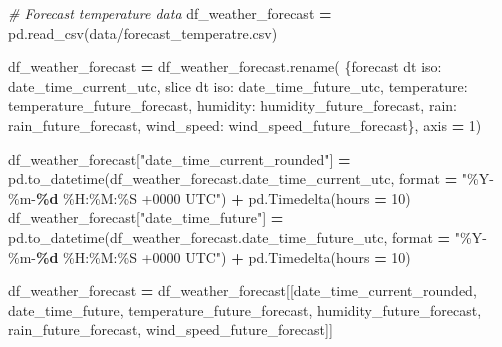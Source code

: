 \documentclass[mstat,12pt]{unswthesis}
\newenvironment{Shaded}{\begin{snugshade}}{\end{snugshade}}
\newcommand{\BuiltInTok}[1]{#1}
\newcommand{\CommentTok}[1]{\textcolor[rgb]{0.56,0.35,0.01}{\textit{#1}}}
\newcommand{\DecValTok}[1]{\textcolor[rgb]{0.00,0.00,0.81}{#1}}
\newcommand{\NormalTok}[1]{#1}
\newcommand{\OperatorTok}[1]{\textcolor[rgb]{0.81,0.36,0.00}{\textbf{#1}}}
\newcommand{\SpecialCharTok}[1]{\textcolor[rgb]{0.81,0.36,0.00}{\textbf{#1}}}
\newcommand{\StringTok}[1]{\textcolor[rgb]{0.31,0.60,0.02}{#1}}
\begin{document}
\begin{Shaded}
\begin{Highlighting}[]
\CommentTok{\# Forecast temperature data}
\NormalTok{df\_weather\_forecast }\OperatorTok{=}\NormalTok{ pd.read\_csv(}\StringTok{\textquotesingle{}data/forecast\_temperatre.csv\textquotesingle{}}\NormalTok{)}

\NormalTok{df\_weather\_forecast }\OperatorTok{=}\NormalTok{ df\_weather\_forecast.rename(}
\NormalTok{  \{}\StringTok{\textquotesingle{}forecast dt iso\textquotesingle{}}\NormalTok{: }\StringTok{\textquotesingle{}date\_time\_current\_utc\textquotesingle{}}\NormalTok{, }
   \StringTok{\textquotesingle{}slice dt iso\textquotesingle{}}\NormalTok{: }\StringTok{\textquotesingle{}date\_time\_future\_utc\textquotesingle{}}\NormalTok{,}
   \StringTok{\textquotesingle{}temperature\textquotesingle{}}\NormalTok{: }\StringTok{\textquotesingle{}temperature\_future\_forecast\textquotesingle{}}\NormalTok{,}
   \StringTok{\textquotesingle{}humidity\textquotesingle{}}\NormalTok{: }\StringTok{\textquotesingle{}humidity\_future\_forecast\textquotesingle{}}\NormalTok{,}
   \StringTok{\textquotesingle{}rain\textquotesingle{}}\NormalTok{: }\StringTok{\textquotesingle{}rain\_future\_forecast\textquotesingle{}}\NormalTok{,}
   \StringTok{\textquotesingle{}wind\_speed\textquotesingle{}}\NormalTok{: }\StringTok{\textquotesingle{}wind\_speed\_future\_forecast\textquotesingle{}}\NormalTok{\}, axis }\OperatorTok{=} \DecValTok{1}\NormalTok{)}

\NormalTok{df\_weather\_forecast[}\StringTok{"date\_time\_current\_rounded"}\NormalTok{] }\OperatorTok{=}   
\NormalTok{    pd.to\_datetime(df\_weather\_forecast.date\_time\_current\_utc, }
    \BuiltInTok{format} \OperatorTok{=} \StringTok{"\%Y{-}\%m{-}}\SpecialCharTok{\%d}\StringTok{ \%H:\%M:\%S +0000 UTC"}\NormalTok{) }\OperatorTok{+}\NormalTok{ pd.Timedelta(hours }\OperatorTok{=} \DecValTok{10}\NormalTok{)}
\NormalTok{df\_weather\_forecast[}\StringTok{"date\_time\_future"}\NormalTok{] }\OperatorTok{=} 
\NormalTok{    pd.to\_datetime(df\_weather\_forecast.date\_time\_future\_utc, }
    \BuiltInTok{format} \OperatorTok{=} \StringTok{"\%Y{-}\%m{-}}\SpecialCharTok{\%d}\StringTok{ \%H:\%M:\%S +0000 UTC"}\NormalTok{) }\OperatorTok{+}\NormalTok{ pd.Timedelta(hours }\OperatorTok{=} \DecValTok{10}\NormalTok{)}

\NormalTok{df\_weather\_forecast }\OperatorTok{=} 
\NormalTok{    df\_weather\_forecast[[}\StringTok{\textquotesingle{}date\_time\_current\_rounded\textquotesingle{}}\NormalTok{, }\StringTok{\textquotesingle{}date\_time\_future\textquotesingle{}}\NormalTok{, }
      \StringTok{\textquotesingle{}temperature\_future\_forecast\textquotesingle{}}\NormalTok{, }\StringTok{\textquotesingle{}humidity\_future\_forecast\textquotesingle{}}\NormalTok{, }
      \StringTok{\textquotesingle{}rain\_future\_forecast\textquotesingle{}}\NormalTok{, }\StringTok{\textquotesingle{}wind\_speed\_future\_forecast\textquotesingle{}}\NormalTok{]]}
\end{Highlighting}
\end{Shaded}
\end{document}
